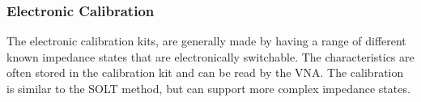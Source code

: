\subsubsection{Electronic Calibration}
The electronic calibration kits, are generally made by having a range of different known impedance states that are electronically switchable\cite{agilentEcal}. The characteristics are often stored in the calibration kit and can be read by the VNA. The calibration is similar to the SOLT method, but can support more complex impedance states\cite{agilentEcal}. 




